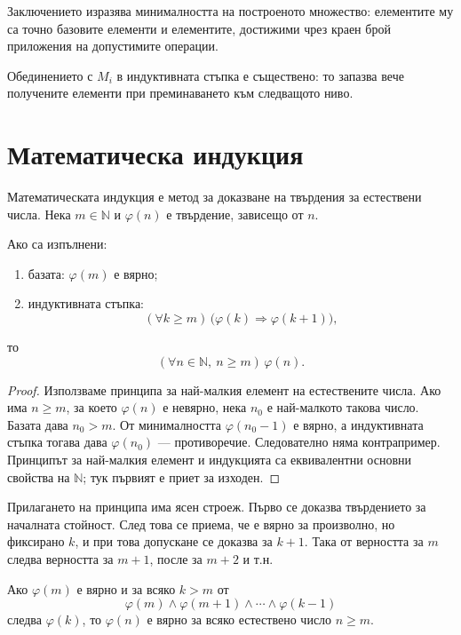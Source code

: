 Заключението изразява минималността на построеното множество: елементите му са точно базовите елементи и елементите, достижими чрез краен брой приложения на допустимите операции.

\begin{supp}[Бележка]
Обединението с $M_i$ в индуктивната стъпка е съществено: то запазва вече получените елементи при преминаването към следващото ниво.
\end{supp}

\section{Математическа индукция}\label{s:1.2}

Математическата индукция е метод за доказване на твърдения за естествени числа. Нека $m\in\mathbb N$ и $\varphi(n)$ е твърдение, зависещо от $n$.

\begin{keythm}
Ако са изпълнени:

\begin{enumerate}
\item базата: $\varphi(m)$ е вярно;
\item индуктивната стъпка:
\[
(\forall k\geq m)\,\bigl(\varphi(k)\Rightarrow\varphi(k+1)\bigr),
\]
\end{enumerate}

то
\[
(\forall n\in\mathbb N,\ n\geq m)\,\varphi(n).
\]
\end{keythm}

\begin{proof}
Използваме принципа за най-малкия елемент на естествените числа. Ако има $n\ge m$, за което $\varphi(n)$ е невярно, нека $n_0$ е най-малкото такова число. Базата дава $n_0>m$. От минималността $\varphi(n_0-1)$ е вярно, а индуктивната стъпка тогава дава $\varphi(n_0)$ --- противоречие. Следователно няма контрапример. Принципът за най-малкия елемент и индукцията са еквивалентни основни свойства на $\mathbb N$; тук първият е приет за изходен.
\end{proof}

Прилагането на принципа има ясен строеж. Първо се доказва твърдението за началната стойност. След това се приема, че е вярно за произволно, но фиксирано $k$, и при това допускане се доказва за $k+1$. Така от верността за $m$ следва верността за $m+1$, после за $m+2$ и т.н.

\begin{keythm}
Ако $\varphi(m)$ е вярно и за всяко $k>m$ от
\[
\varphi(m)\land\varphi(m+1)\land\cdots\land\varphi(k-1)
\]
следва $\varphi(k)$, то $\varphi(n)$ е вярно за всяко естествено число $n\geq m$.
\end{keythm}


